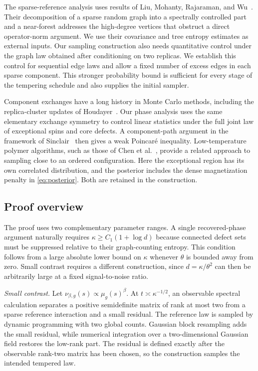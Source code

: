 \documentclass[11pt]{article}
\numberwithin{equation}{section}
\begin{document}
The sparse-reference analysis uses results of Liu, Mohanty, Rajaraman, and Wu~\cite{LMRW24}. Their decomposition of a sparse random graph into a spectrally controlled part and a near-forest addresses the high-degree vertices that obstruct a direct operator-norm argument. We use their covariance and tree entropy estimates as external inputs. Our sampling construction also needs quantitative control under the graph law obtained after conditioning on two replicas. We establish this control for sequential edge laws and allow a fixed number of excess edges in each sparse component. This stronger probability bound is sufficient for every stage of the tempering schedule and also supplies the initial sampler.

Component exchanges have a long history in Monte Carlo methods, including the replica-cluster updates of Houdayer~\cite{Hou01}. Our phase analysis uses the same elementary exchange symmetry to control linear statistics under the full joint law of exceptional spins and core defects. A component-path argument in the framework of Sinclair~\cite{Sin92} then gives a weak Poincar\'e inequality. Low-temperature polymer algorithms, such as those of Chen et al.~\cite{CGG21}, provide a related approach to sampling close to an ordered configuration. Here the exceptional region has its own correlated distribution, and the posterior includes the dense magnetization penalty in \eqref{eq:posterior}. Both are retained in the construction.

\subsection{Proof overview}

The proof uses two complementary parameter ranges. A single recovered-phase argument naturally requires $\kappa\ge C_1(1+\log d)$ because connected defect sets must be suppressed relative to their graph-counting entropy. This condition follows from a large absolute lower bound on $\kappa$ whenever $\theta$ is bounded away from zero. Small contrast requires a different construction, since $d=\kappa/\theta^2$ can then be arbitrarily large at a fixed signal-to-noise ratio.

\emph{Small contrast.} Let $\nu_{\beta,g}(s)\propto\mu_g(s)^\beta$. At $t\asymp\kappa^{-1/2}$, an observable spectral calculation separates a positive semidefinite matrix of rank at most two from a sparse reference interaction and a small residual. The reference law is sampled by dynamic programming with two global counts. Gaussian block resampling adds the small residual, while numerical integration over a two-dimensional Gaussian field restores the low-rank part. The residual is defined exactly after the observable rank-two matrix has been chosen, so the construction samples the intended tempered law.
\end{document}
